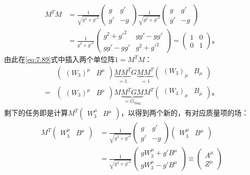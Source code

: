 \begin{equation}
\begin{aligned}
M^TM & = \frac{1}{\sqrt{g^2+g'^2}} \begin{pmatrix}
g & g'\\ g'&-g
\end{pmatrix} \frac{1}{\sqrt{g^2+g'^2}} \begin{pmatrix}
g & g'\\ g'&-g
\end{pmatrix} \\
& = \frac{1}{g^2+g'^2} \begin{pmatrix}
g^2+g'^2 & gg'-gg'\\ gg'-gg'&g^2+g'^2
\end{pmatrix} = \begin{pmatrix}
1 & 0\\ 0 & 1
\end{pmatrix}\text{。}
\end{aligned}
\end{equation}
由此在\ref{eq:7.89}式中插入两个单位阵$1 = M^TM$：
\begin{equation}
\begin{aligned}
&\begin{pmatrix}
(W_3)^\mu & B^\mu
\end{pmatrix} \underbrace{MM^T}_{=1} G \underbrace{MM^T}_{=1} \begin{pmatrix}
(W_3)_\mu & B_\mu
\end{pmatrix} \\ =& \begin{pmatrix}
(W_3)^\mu & B^\mu
\end{pmatrix} M\underbrace{M^TGM}_{=G_\text{diag}}M^T \begin{pmatrix}
(W_3)_\mu & B_\mu
\end{pmatrix} \text{。}
\end{aligned}
\end{equation}
剩下的任务即是计算$M^T \begin{pmatrix}
W_3^\mu & B^\mu
\end{pmatrix}$，以得到两个新的，有对应质量项的场：
\begin{equation}
\begin{aligned}
M^T \begin{pmatrix}
W_3^\mu & B^\mu
\end{pmatrix} &= \frac{1}{\sqrt{g^2+g'^2}} \begin{pmatrix}
g & g'\\ g'&-g
\end{pmatrix} \begin{pmatrix}
W_3^\mu & B^\mu
\end{pmatrix} \\
& = \frac{1}{\sqrt{g^2+g'^2}} \begin{pmatrix}
gW_3^\mu + g'B^\mu \\ gW_3^\mu - g'B^\mu
\end{pmatrix} \equiv \begin{pmatrix}
A^\mu \\ Z^\mu
\end{pmatrix}
\end{aligned}
\end{equation}
